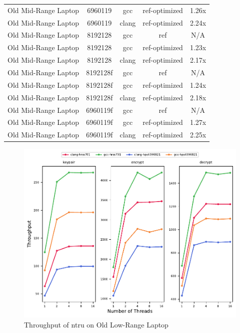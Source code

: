 \begin{table}[H]
\begin{tabularx}{\linewidth}{X c c c c}
        Old Mid-Range Laptop &              6960119 &                  gcc &        ref-optimized &                1.26x\\
        Old Mid-Range Laptop &              6960119 &                clang &        ref-optimized &                2.24x\\
        Old Mid-Range Laptop &              8192128 &                  gcc &                  ref &                  N/A\\
        Old Mid-Range Laptop &              8192128 &                  gcc &        ref-optimized &                1.23x\\
        Old Mid-Range Laptop &              8192128 &                clang &        ref-optimized &                2.17x\\
        Old Mid-Range Laptop &             8192128f &                  gcc &                  ref &                  N/A\\
        Old Mid-Range Laptop &             8192128f &                  gcc &        ref-optimized &                1.24x\\
        Old Mid-Range Laptop &             8192128f &                clang &        ref-optimized &                2.18x\\
        Old Mid-Range Laptop &             6960119f &                  gcc &                  ref &                  N/A\\
        Old Mid-Range Laptop &             6960119f &                  gcc &        ref-optimized &                1.27x\\
        Old Mid-Range Laptop &             6960119f &                clang &        ref-optimized &                2.25x\\
        \bottomrule
    \end{tabularx}
\end{table}

\begin{figure}
    \centering
    \includegraphics[scale=0.75]{chapters/results/throughput/Old Low-Range Laptop_ntru.pdf}
    \caption{Throughput of \gls{ntru} on Old Low-Range Laptop}
    \label{figure:results:throughput:ntru:old-low-range-laptop}
\end{figure}

